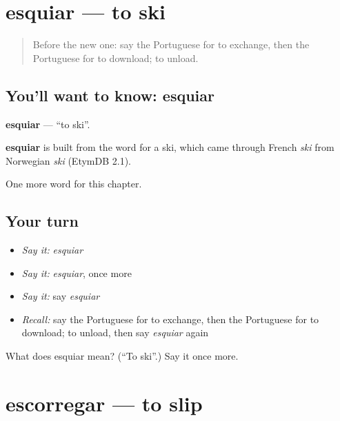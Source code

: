\section[esquiar]{esquiar — to ski}

\label{lesson:PT-C208-esquiar}



\begin{quote}
Before the new one: say the Portuguese for to exchange, then the Portuguese for to download; to unload.
\end{quote}

\subsection*{You'll want to know: esquiar}
\textbf{esquiar} — \textquotedblleft{}to ski\textquotedblright{}.

\begin{cousinweb}
\textbf{esquiar} is built from the word for a ski, which came through French \emph{ski} from Norwegian \emph{ski} (EtymDB 2.1).
\end{cousinweb}

\begin{grammarlens}[title={What you've built}]
One more word for this chapter.
\end{grammarlens}

\subsection*{Your turn}
\begin{itemize}
\raggedright
  \item \emph{Say it:} \emph{esquiar}
  \item \emph{Say it:} \emph{esquiar}, once more
  \item \emph{Say it:} say \emph{esquiar}
  \item \emph{Recall:} say the Portuguese for to exchange, then the Portuguese for to download; to unload, then say \emph{esquiar} again
\end{itemize}

\begin{tcolorbox}[breakable,colback=teal!4,colframe=teal!35!black,title={Before you move on}]
What does esquiar mean? (\textquotedblleft{}To ski\textquotedblright{}.) Say it once more.
\end{tcolorbox}
\section[escorregar]{escorregar — to slip}

